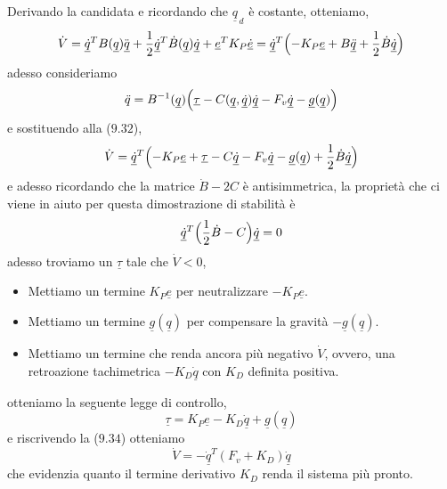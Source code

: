 Derivando la candidata e ricordando che $\underline{q}_{\,d}$ è costante, otteniamo,
\begin{equation}
	\dot{V} = \underline{\dot{q}}^T B(\underline{q}) \ddot{\underline{q}} + \frac{1}{2}\underline{\dot{q}}^T \dot{B}(\underline{q}) \underline{\dot{q}} + \underline{e}^T K_P \underline{\dot{e}} = \underline{\dot{q}}^T \Bigl( -K_P \underline{e} + B \underline{\ddot{q}} + \frac{1}{2} \dot{B}\underline{\dot{q}} \Bigr)
\end{equation}
adesso consideriamo
\begin{equation}
	\ddot{q} = B^{-1}(\underline{q}) \Bigl( \underline{\tau} - C(\underline{q}, \underline{\dot{q}})\underline{\dot{q}} - F_v \underline{\dot{q}} - \underline{g}(\underline{q}) \Bigr)
\end{equation}
e sostituendo alla ($9.32$),
\begin{equation}
	\dot{V} = \underline{\dot{q}}^T \Bigl( -K_P \underline{e} + \underline{\tau} - C \underline{\dot{q}} - F_v \underline{\dot{q}} - \underline{g}(\underline{q}) + \frac{1}{2} \dot{B} \underline{\dot{q}} \Bigr)
\end{equation}
e adesso ricordando che la matrice $\dot{B} - 2C$ è antisimmetrica, la proprietà che ci viene in aiuto per questa dimostrazione di stabilità è
\begin{equation}
	\underline{\dot{q}}^T \Bigl( \frac{1}{2} \dot{B} - C \Bigr) \underline{\dot{q}} = 0
\end{equation}
adesso troviamo un $\underline{\tau}$ tale che $\dot{V} < 0$,
\begin{itemize}
	\item Mettiamo un termine $K_P \underline{e}$ per neutralizzare $- K_P \underline{e}$.
	\item Mettiamo un termine $\underline{g}(\underline{q})$ per compensare la gravità $-\underline{g}(\underline{q})$.
	\item Mettiamo un termine che renda ancora più negativo $\dot{V}$, ovvero, una retroazione tachimetrica $- K_D \underline{\dot{q}}$ con $K_D$ definita positiva.
\end{itemize}
otteniamo la seguente legge di controllo,
\begin{equation}
	\underline{\tau} = K_P \underline{e} - K_D \underline{\dot{q}} + \underline{g}(\underline{q})
\end{equation}
e riscrivendo la ($9.34$) otteniamo
\begin{equation}
	\dot{V} = - \underline{\dot{q}}^T (F_v + K_D)\underline{\dot{q}}
\end{equation}
che evidenzia quanto il termine derivativo $K_D$ renda il sistema più pronto.

